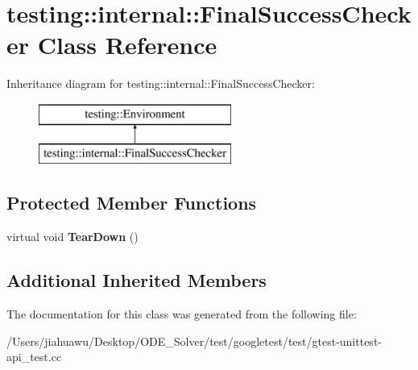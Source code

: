 \hypertarget{classtesting_1_1internal_1_1_final_success_checker}{}\section{testing\+:\+:internal\+:\+:Final\+Success\+Checker Class Reference}
\label{classtesting_1_1internal_1_1_final_success_checker}
Inheritance diagram for testing\+:\+:internal\+:\+:Final\+Success\+Checker\+:\begin{figure}[H]
\begin{center}
\leavevmode
\includegraphics[height=2.000000cm]{classtesting_1_1internal_1_1_final_success_checker}
\end{center}
\end{figure}
\subsection*{Protected Member Functions}
\begin{DoxyCompactItemize}
\item 
\mbox{\label{classtesting_1_1internal_1_1_final_success_checker_a8f39d12a1f2bfe8c6c04b5c6749382c9}} 
virtual void {\bfseries Tear\+Down} ()
\end{DoxyCompactItemize}
\subsection*{Additional Inherited Members}


The documentation for this class was generated from the following file\+:\begin{DoxyCompactItemize}
\item 
/\+Users/jiahuawu/\+Desktop/\+O\+D\+E\+\_\+\+Solver/test/googletest/test/gtest-\/unittest-\/api\+\_\+test.\+cc\end{DoxyCompactItemize}
